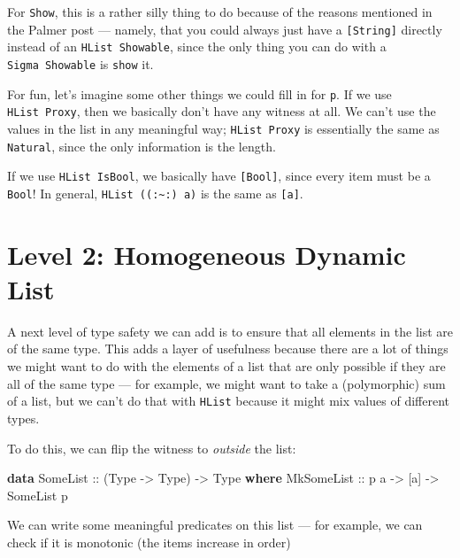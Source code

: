 \documentclass[]{article}
\newenvironment{Shaded}{}{}
\newcommand{\DataTypeTok}[1]{\textcolor[rgb]{0.56,0.13,0.00}{#1}}
\newcommand{\KeywordTok}[1]{\textcolor[rgb]{0.00,0.44,0.13}{\textbf{#1}}}
\newcommand{\NormalTok}[1]{#1}
\newcommand{\OtherTok}[1]{\textcolor[rgb]{0.00,0.44,0.13}{#1}}
\begin{document}
For \texttt{Show}, this is a rather silly thing to do because of the reasons
mentioned in the Palmer post --- namely, that you could always just have a
\texttt{{[}String{]}} directly instead of an \texttt{HList\ Showable}, since the
only thing you can do with a \texttt{Sigma\ Showable} is \texttt{show} it.

For fun, let's imagine some other things we could fill in for \texttt{p}. If we
use \texttt{HList\ Proxy}, then we basically don't have any witness at all. We
can't use the values in the list in any meaningful way; \texttt{HList\ Proxy} is
essentially the same as \texttt{Natural}, since the only information is the
length.

If we use \texttt{HList\ IsBool}, we basically have \texttt{{[}Bool{]}}, since
every item must be a \texttt{Bool}! In general,
\texttt{HList\ ((:\textasciitilde{}:)\ a)} is the same as \texttt{{[}a{]}}.

\section{Level 2: Homogeneous Dynamic
List}\label{level-2-homogeneous-dynamic-list}

A next level of type safety we can add is to ensure that all elements in the
list are of the same type. This adds a layer of usefulness because there are a
lot of things we might want to do with the elements of a list that are only
possible if they are all of the same type --- for example, we might want to take
a (polymorphic) sum of a list, but we can't do that with \texttt{HList} because
it might mix values of different types.

To do this, we can flip the witness to \emph{outside} the list:

\begin{Shaded}
\begin{Highlighting}[]
\KeywordTok{data} \DataTypeTok{SomeList}\OtherTok{ ::}\NormalTok{ (}\DataTypeTok{Type} \OtherTok{{-}\textgreater{}} \DataTypeTok{Type}\NormalTok{) }\OtherTok{{-}\textgreater{}} \DataTypeTok{Type} \KeywordTok{where}
    \DataTypeTok{MkSomeList}\OtherTok{ ::}\NormalTok{ p a }\OtherTok{{-}\textgreater{}}\NormalTok{ [a] }\OtherTok{{-}\textgreater{}} \DataTypeTok{SomeList}\NormalTok{ p}
\end{Highlighting}
\end{Shaded}

We can write some meaningful predicates on this list --- for example, we can
check if it is monotonic (the items increase in order)
\end{document}
